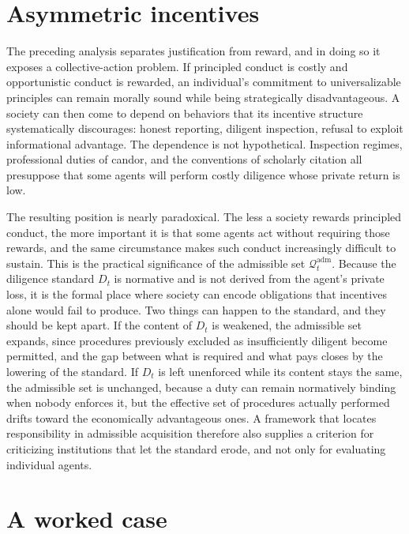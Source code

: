 \documentclass[11pt]{article}
\newcommand{\Q}{\mathcal Q}
\newcommand{\adm}{\mathrm{adm}}
\theoremstyle{definition}
\begin{document}
\section{Asymmetric incentives}

The preceding analysis separates justification from reward, and in doing so it exposes a collective-action problem. If principled conduct is costly and opportunistic conduct is rewarded, an individual's commitment to universalizable principles can remain morally sound while being strategically disadvantageous. A society can then come to depend on behaviors that its incentive structure systematically discourages: honest reporting, diligent inspection, refusal to exploit informational advantage. The dependence is not hypothetical. Inspection regimes, professional duties of candor, and the conventions of scholarly citation all presuppose that some agents will perform costly diligence whose private return is low.

The resulting position is nearly paradoxical. The less a society rewards principled conduct, the more important it is that some agents act without requiring those rewards, and the same circumstance makes such conduct increasingly difficult to sustain. This is the practical significance of the admissible set $\Q_t^{\adm}$. Because the diligence standard $D_t$ is normative and is not derived from the agent's private loss, it is the formal place where society can encode obligations that incentives alone would fail to produce. Two things can happen to the standard, and they should be kept apart. If the content of $D_t$ is weakened, the admissible set expands, since procedures previously excluded as insufficiently diligent become permitted, and the gap between what is required and what pays closes by the lowering of the standard. If $D_t$ is left unenforced while its content stays the same, the admissible set is unchanged, because a duty can remain normatively binding when nobody enforces it, but the effective set of procedures actually performed drifts toward the economically advantageous ones. A framework that locates responsibility in admissible acquisition therefore also supplies a criterion for criticizing institutions that let the standard erode, and not only for evaluating individual agents.

\section{A worked case}
\end{document}
